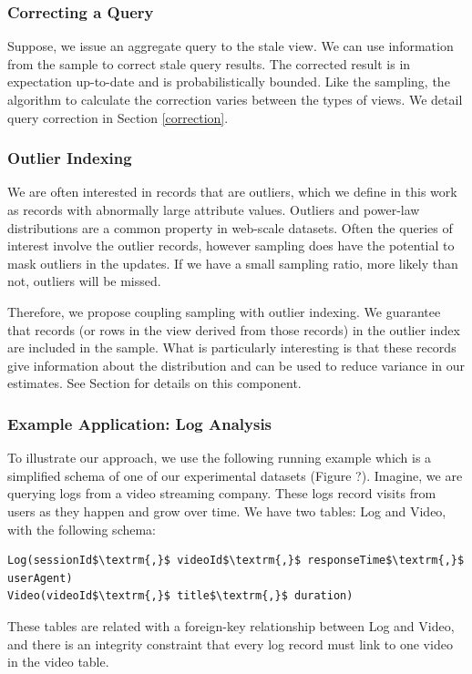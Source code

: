 \subsubsection{Correcting a Query}
Suppose, we issue an aggregate query to the stale view.
We can use information from the sample to correct stale query results.
The corrected result is in expectation up-to-date and is probabilistically bounded.
Like the sampling, the algorithm to calculate the correction varies between the types of views.
We detail query correction in Section \ref{correction}.

\subsubsection{Outlier Indexing}
We are often interested in records that are outliers, 
which we define in this work as records with abnormally large attribute values.
Outliers and power-law distributions are a common property in web-scale datasets.
Often the queries of interest involve the outlier records, however sampling does 
have the potential to mask outliers in the updates.
If we have a small sampling ratio, more likely than not, outliers will be missed.

Therefore, we propose coupling sampling with outlier indexing. 
We guarantee that records (or rows in the view derived from those records) 
in the outlier index are included in the sample.
What is particularly interesting is that these records give information about the distribution 
and can be used to reduce variance in our estimates.
See Section \label{outlier} for details on this component.

\subsubsection{Example Application: Log Analysis}
To illustrate our approach, we use the following running example which is a 
simplified schema of one of our experimental datasets (Figure ?).
Imagine, we are querying logs from a video streaming company. 
These logs record visits from users as they happen and grow over time.
We have two tables: Log and Video, with the following schema:

\begin{lstlisting}[mathescape]
Log(sessionId$\textrm{,}$ videoId$\textrm{,}$ responseTime$\textrm{,}$ userAgent)
Video(videoId$\textrm{,}$ title$\textrm{,}$ duration)
\end{lstlisting}
These tables are related with a foreign-key relationship between
Log and Video, and there is an integrity constraint that every log
record must link to one video in the video table.

